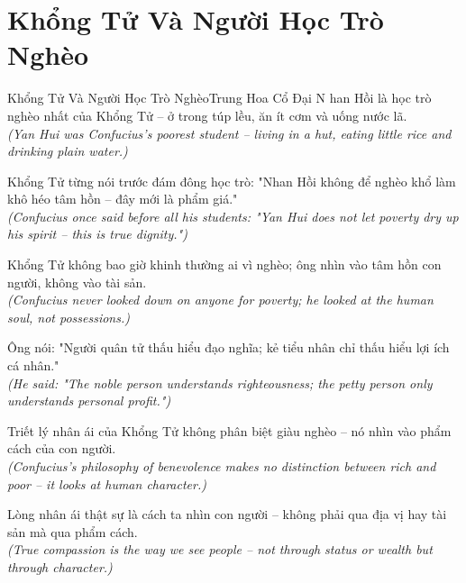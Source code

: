 \section{Khổng Tử Và Người Học Trò Nghèo}
\begin{truyen}{Khổng Tử Và Người Học Trò Nghèo}{Trung Hoa Cổ Đại}
N han Hồi là học trò nghèo nhất của Khổng Tử -- ở trong túp lều, ăn ít cơm và uống nước lã.\\
\textit{(Yan Hui was Confucius's poorest student -- living in a hut, eating little rice and drinking plain water.)}

Khổng Tử từng nói trước đám đông học trò: "Nhan Hồi không để nghèo khổ làm khô héo tâm hồn -- đây mới là phẩm giá."\\
\textit{(Confucius once said before all his students: "Yan Hui does not let poverty dry up his spirit -- this is true dignity.")}

Khổng Tử không bao giờ khinh thường ai vì nghèo; ông nhìn vào tâm hồn con người, không vào tài sản.\\
\textit{(Confucius never looked down on anyone for poverty; he looked at the human soul, not possessions.)}

Ông nói: "Người quân tử thấu hiểu đạo nghĩa; kẻ tiểu nhân chỉ thấu hiểu lợi ích cá nhân."\\
\textit{(He said: "The noble person understands righteousness; the petty person only understands personal profit.")}

Triết lý nhân ái của Khổng Tử không phân biệt giàu nghèo -- nó nhìn vào phẩm cách của con người.\\
\textit{(Confucius's philosophy of benevolence makes no distinction between rich and poor -- it looks at human character.)}

\end{truyen}
\begin{baihoc}
  Lòng nhân ái thật sự là cách ta nhìn con người -- không phải qua địa vị hay tài sản mà qua phẩm cách.\\
  \textit{(True compassion is the way we see people -- not through status or wealth but through character.)}
\end{baihoc}

